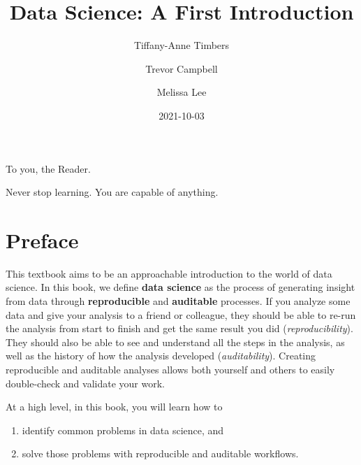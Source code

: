 \documentclass[
]{book}
\title{Data Science: A First Introduction}
\author{Tiffany-Anne Timbers \and Trevor Campbell \and Melissa Lee}
\date{2021-10-03}
\providecommand{\tightlist}{%
  \setlength{\itemsep}{0pt}\setlength{\parskip}{0pt}}
\begin{document}
\maketitle


\thispagestyle{empty}

\begin{center}
To you, the Reader.

Never stop learning. You are capable of anything.
\end{center}

\setlength{\abovedisplayskip}{-5pt}
\setlength{\abovedisplayshortskip}{-5pt}

{
\setcounter{tocdepth}{2}
\tableofcontents
}
\hypertarget{preface}{%
\chapter*{Preface}\label{preface}}


This textbook aims to be an approachable introduction to the world of data science.
In this book, we define \textbf{data science}  as the process of generating
insight from data through \textbf{reproducible}  and \textbf{auditable}  processes.
If you analyze some data and give your analysis to a friend or colleague, they should
be able to re-run the analysis from start to finish and get the same result you did (\emph{reproducibility}).
They should also be able to see and understand all the steps in the analysis, as well as the history of how
the analysis developed (\emph{auditability}). Creating reproducible and auditable
analyses allows both yourself and others to easily double-check and validate your work.

At a high level, in this book, you will learn how to

\begin{enumerate}
\def\labelenumi{(\arabic{enumi})}
\tightlist
\item
  identify common problems in data science, and
\item
  solve those problems with reproducible and auditable workflows.
\end{enumerate}
\end{document}
